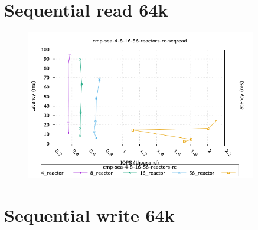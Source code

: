 \section{Sequential read 64k}

\begin{figure}[ht]
  \centering
  \includegraphics[width=0.9\textwidth]{cmp_sea_4_8_16_56_reactors_rc_seqread_iops_vs_lat.png}
\end{figure}

%
\newpage
\pagebreak

\section{Sequential write 64k}


